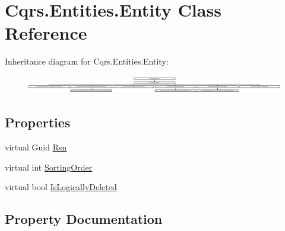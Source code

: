 \hypertarget{classCqrs_1_1Entities_1_1Entity}{}\section{Cqrs.\+Entities.\+Entity Class Reference}
\label{classCqrs_1_1Entities_1_1Entity}
Inheritance diagram for Cqrs.\+Entities.\+Entity\+:\begin{figure}[H]
\begin{center}
\leavevmode
\includegraphics[height=0.801144cm]{classCqrs_1_1Entities_1_1Entity}
\end{center}
\end{figure}
\subsection*{Properties}
\begin{DoxyCompactItemize}
\item 
virtual Guid \hyperlink{classCqrs_1_1Entities_1_1Entity_a5c7605c4ab598f2975b914db7a274796_a5c7605c4ab598f2975b914db7a274796}{Rsn}
\item 
virtual int \hyperlink{classCqrs_1_1Entities_1_1Entity_a9913174d2d333a505af68a0f7e5fd2ca_a9913174d2d333a505af68a0f7e5fd2ca}{Sorting\+Order}
\item 
virtual bool \hyperlink{classCqrs_1_1Entities_1_1Entity_a0d7379f43369a62bfe5783005d3e6ceb_a0d7379f43369a62bfe5783005d3e6ceb}{Is\+Logically\+Deleted}
\end{DoxyCompactItemize}


\subsection{Property Documentation}
\mbox{\label{classCqrs_1_1Entities_1_1Entity_a0d7379f43369a62bfe5783005d3e6ceb_a0d7379f43369a62bfe5783005d3e6ceb}} 
